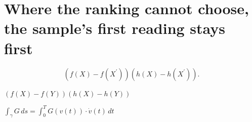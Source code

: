 \documentclass{article}
\begin{document}
\section{Where the ranking cannot choose, the sample's first reading stays first}
\begin{equation}\left(f(X)-f\left(X^{\prime}\right)\right)\left(h(X)-h\left(X^{\prime}\right)\right).\end{equation}

$(f(X)-f(Y))(h(X)-h(Y))$

$\int_{\gamma}G\,ds=\int_{0}^{T}G(v(t))\cdot\dot{v}(t)\,dt$
\end{document}

